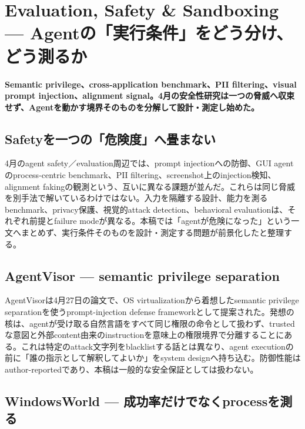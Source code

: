 \section{Evaluation, Safety \& Sandboxing — Agentの「実行条件」をどう分け、どう測るか}
\label{pkg:evaluation-safety-sandbox-april}
\noindent\textbf{Semantic privilege、cross-application benchmark、PII filtering、visual prompt injection、alignment signal。4月の安全性研究は一つの脅威へ収束せず、Agentを動かす境界そのものを分解して設計・測定し始めた。}\autocite{src-2f8952da2dc3,src-3efc4342b784,src-477d406be59c,src-73ae4b975e7b,src-8cf1b0dc8361,src-a408165af133}

\subsection{Safetyを一つの「危険度」へ畳まない}

4月のagent safety／evaluation周辺では、prompt injectionへの防御、GUI agentのprocess-centric benchmark、PII filtering、screenshot上のinjection検知、alignment fakingの観測という、互いに異なる課題が並んだ。これらは同じ脅威を別手法で解いているわけではない。入力を隔離する設計、能力を測るbenchmark、privacy保護、視覚的attack detection、behavioral evaluationは、それぞれ前提とfailure modeが異なる。本稿では「agentが危険になった」という一文へまとめず、実行条件そのものを設計・測定する問題が前景化したと整理する。\autocite{src-2f8952da2dc3,src-3efc4342b784,src-477d406be59c,src-73ae4b975e7b,src-8cf1b0dc8361,src-a408165af133}


\subsection{AgentVisor — semantic privilege separation}

AgentVisorは4月27日の論文で、OS virtualizationから着想したsemantic privilege separationを使うprompt-injection defense frameworkとして提案された。発想の核は、agentが受け取る自然言語をすべて同じ権限の命令として扱わず、trustedな意図と外部content由来のinstructionを意味上の権限境界で分離することにある。これは特定のattack文字列をblacklistする話とは異なり、agent executionの前に「誰の指示として解釈してよいか」をsystem designへ持ち込む。防御性能はauthor-reportedであり、本稿は一般的な安全保証としては扱わない。\autocite{src-8cf1b0dc8361}


\subsection{WindowsWorld — 成功率だけでなくprocessを測る}

